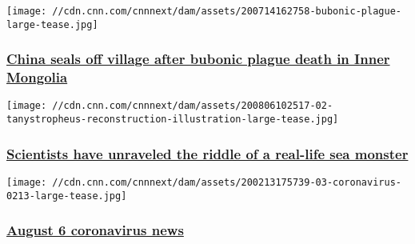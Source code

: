 \href{/2020/08/07/asia/china-mongolia-bubonic-plague-death-intl-hnk-scli-scn/index.html}{}

\texttt{[image: //cdn.cnn.com/cnnnext/dam/assets/200714162758-bubonic-plague-large-tease.jpg]}

\hypertarget{china-seals-off-village-after-bubonic-plague-death-in-inner-mongolia}{%
\subsubsection{\texorpdfstring{\href{/2020/08/07/asia/china-mongolia-bubonic-plague-death-intl-hnk-scli-scn/index.html}{China
seals off village after bubonic plague death in Inner
Mongolia}}{China seals off village after bubonic plague death in Inner Mongolia}}\label{china-seals-off-village-after-bubonic-plague-death-in-inner-mongolia}}

\href{/2020/08/06/world/scientists-fossil-mystery-tanystropheus-scn-trnd/index.html}{}

\texttt{[image: //cdn.cnn.com/cnnnext/dam/assets/200806102517-02-tanystropheus-reconstruction-illustration-large-tease.jpg]}

\hypertarget{scientists-have-unraveled-the-riddle-of-a-real-life-sea-monster}{%
\subsubsection{\texorpdfstring{\href{/2020/08/06/world/scientists-fossil-mystery-tanystropheus-scn-trnd/index.html}{Scientists
have unraveled the riddle of a real-life sea
monster}}{Scientists have unraveled the riddle of a real-life sea monster}}\label{scientists-have-unraveled-the-riddle-of-a-real-life-sea-monster}}

\href{/world/live-news/coronavirus-pandemic-08-06-20-intl/index.html}{}

\texttt{[image: //cdn.cnn.com/cnnnext/dam/assets/200213175739-03-coronavirus-0213-large-tease.jpg]}

\hypertarget{august-6-coronavirus-news}{%
\subsubsection{\texorpdfstring{\href{/world/live-news/coronavirus-pandemic-08-06-20-intl/index.html}{August
6 coronavirus
news}}{August 6 coronavirus news}}\label{august-6-coronavirus-news}}

\href{/videos/health/2020/08/06/entire-august-6-coronavirus-town-hall-part-3-sot-vpx.cnn}{}

